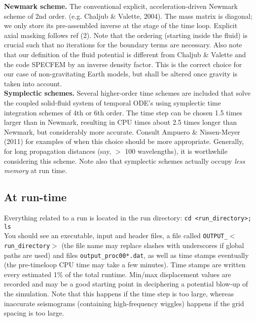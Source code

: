 \documentclass[11pt,letter,fleqn,english,notitlepage]{article}
\begin{document}
\noindent \textbf{Newmark scheme.}
 The conventional explicit, acceleration-driven Newmark scheme of 2nd order.
(e.g. Chaljub \& Valette, 2004). The mass matrix is diagonal; we only store 
 its pre-assembled inverse at the stage of the time loop.
 Explicit axial masking follows ref (2).
 Note that the ordering (starting inside the fluid) is crucial such that no 
 iterations for the boundary terms are necessary.
 Also note that our definition of the fluid potential is different from 
 Chaljub \& Valette and the code SPECFEM by an inverse density factor.
 This is the correct choice for our case of non-gravitating Earth models, 
 but shall be altered once gravity is taken into account.\\

\noindent \textbf{Symplectic schemes.}
Several higher-order time schemes are included that solve the 
coupled solid-fluid system of temporal ODE's
using symplectic time integration schemes of 4th or 6th order.
The time step can be chosen 1.5 times larger than in Newmark, resulting 
in CPU times about 2.5 times longer than Newmark, but considerably more 
accurate. Consult Ampuero \& Nissen-Meyer (2011) for examples of when 
this choice should be more appropriate. Generally, for long propagation 
distances (say, $>$ 100 wavelengths), it is worthwhile considering this scheme. 
Note also that symplectic schemes actually occupy \textit{less memory} at run time.

\subsection{At run-time} 
Everything related to a run is located in the run directory: {\tt cd <run\_directory>; ls}\\
\noindent You should see an executable, input and 
header files, a file called {\tt OUTPUT\_$<$run\_directory$>$} (the file name may replace slashes 
with underscores if global paths are used) and files {\tt output\_proc00*.dat},
as well as time stamps eventually (the pre-timeloop CPU time may take a few 
minutes). Time stamps are written every estimated 1\% of the total runtime. 
Min/max displacement values are recorded and may be a good starting point in 
deciphering a potential blow-up of the simulation. Note that this happens if the time step 
is too large, whereas inaccurate seismograms (containing high-frequency wiggles) happens 
if the grid spacing is too large.
\end{document}
